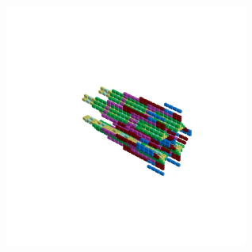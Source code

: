 \begin{minipage}[b]{0.50\linewidth}
\begin{figure}[H]
        \vspace*{-8cm}
        \hspace*{2cm}
        \includegraphics[width=8cm]{src/symmetries/pattern4_4-45.png}
        \vspace*{-2.5cm}
  \caption*{}
  \end{figure}
\end{minipage}
\hspace{1cm}
